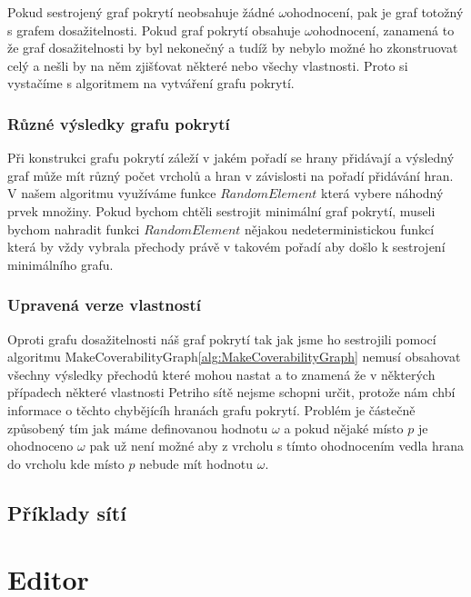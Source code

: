 \documentclass[
  biblatex,
  glossaries,
  index
]{kidiplom}
\begin{document}
Pokud sestrojený graf pokrytí neobsahuje žádné $\omega$ohodnocení,
pak je graf totožný s grafem dosažitelnosti. 
Pokud graf pokrytí obsahuje $\omega$ohodnocení, zanamená to že 
graf dosažitelnosti by byl nekonečný a tudíž by nebylo možné 
ho zkonstruovat celý a nešli by na něm zjišťovat některé nebo všechy vlastnosti.
Proto si vystačíme s algoritmem na vytváření grafu pokrytí.

\subsubsection{Různé výsledky grafu pokrytí}

Při konstrukci grafu pokrytí záleží v jakém pořadí se hrany přidávají
a výsledný graf může mít různý počet vrcholů a hran 
v závislosti na pořadí přidávání hran.
V našem algoritmu využíváme funkce $RandomElement$ která vybere 
náhodný prvek množiny. 
Pokud bychom chtěli sestrojit minimální 
graf pokrytí, museli bychom nahradit funkci $RandomElement$ nějakou
nedeterministickou funkcí která by vždy vybrala přechody právě 
v takovém pořadí aby došlo k sestrojení minimálního grafu.


\subsubsection{Upravená verze vlastností}

Oproti grafu dosažitelnosti náš graf pokrytí tak jak jsme ho sestrojili 
pomocí algoritmu MakeCoverabilityGraph\ref{alg:MakeCoverabilityGraph} 
nemusí obsahovat všechny výsledky přechodů které mohou nastat a to znamená 
že v některých případech některé vlastnosti Petriho sítě nejsme schopni určit, 
protože nám chbí informace o těchto chybějícíh hranách grafu pokrytí.
Problém je částečně způsobený tím jak máme definovanou hodnotu $\omega$ a pokud 
nějaké místo $p$ je ohodnoceno $\omega$ pak už není možné aby z vrcholu s tímto 
ohodnocením vedla hrana do vrcholu kde místo $p$ nebude mít hodnotu $\omega$.



\subsection{Příklady sítí}





\section{Editor}
\end{document}
